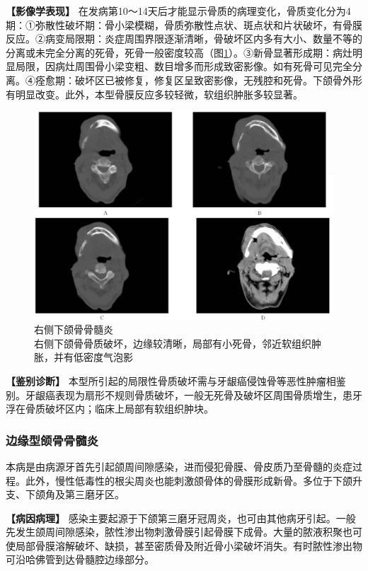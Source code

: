 \textbf{【影像学表现】}
在发病第10～14天后才能显示骨质的病理变化，骨质变化分为4期：①弥散性破坏期：骨小梁模糊，骨质弥散性点状、斑点状和片状破坏，有骨膜反应。②病变局限期：炎症周围界限逐渐清晰，骨破坏区内多有大小、数量不等的分离或未完全分离的死骨，死骨一般密度较高（图\ref{fig7-2}）。③新骨显著形成期：病灶明显局限，因病灶周围骨小梁变粗、数目增多而形成致密影像。如有死骨可见完全分离。④痊愈期：破坏区已被修复，修复区呈致密影像，无残腔和死骨。下颌骨外形有明显改变。此外，本型骨膜反应多较轻微，软组织肿胀多较显著。

\begin{figure}[!htbp]
 \centering
 \includegraphics[width=.7\textwidth,height=\textheight,keepaspectratio]{./images/Image00155.jpg}
 \captionsetup{justification=centering}
 \caption{右侧下颌骨骨髓炎\\{\small 右侧下颌骨骨质破坏，边缘较清晰，局部有小死骨，邻近软组织肿胀，并有低密度气泡影}}
 \label{fig7-2}
  \end{figure} 

\textbf{【鉴别诊断】}
本型所引起的局限性骨质破坏需与牙龈癌侵蚀骨等恶性肿瘤相鉴别。牙龈癌表现为扇形不规则骨质破坏，一般无死骨及破坏区周围骨质增生，患牙浮在骨质破坏区内；临床上局部有软组织肿块。

\subsubsection{边缘型颌骨骨髓炎}

本病是由病源牙首先引起颌周间隙感染，进而侵犯骨膜、骨皮质乃至骨髓的炎症过程。此外，慢性低毒性的根尖周炎也能刺激颌骨体的骨膜形成新骨。多位于下颌升支、下颌角及第三磨牙区。

\textbf{【病因病理】}
感染主要起源于下颌第三磨牙冠周炎，也可由其他病牙引起。一般先发生颌周间隙感染，脓性渗出物刺激骨膜引起骨膜下成骨。大量的脓液积聚也可使局部骨膜溶解破坏、缺损，甚至密质骨及附近骨小梁破坏消失。有时脓性渗出物可沿哈佛管到达骨髓腔边缘部分。

